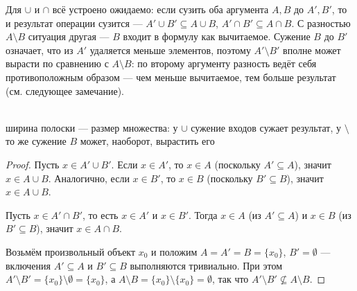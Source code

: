 \begin{intuition}
Для $\cup$ и $\cap$ всё устроено ожидаемо: если сузить оба аргумента $A,B$ до $A',B'$, то и
результат операции сузится — $A' \cup B' \subseteq A \cup B$, $A' \cap B' \subseteq A \cap B$.
С разностью $A \setminus B$ ситуация другая — $B$ входит в формулу как вычитаемое. Сужение
$B$ до $B'$ означает, что из $A'$ удаляется меньше элементов, поэтому $A' \setminus B'$
вполне может вырасти по сравнению с $A \setminus B$: по второму аргументу разность ведёт
себя противоположным образом — чем меньше вычитаемое, тем больше результат (см. следующее
замечание).

\begin{center}
\\
{\footnotesize\color{intuitiongray}ширина полоски — размер множества: у $\cup$ сужение
входов сужает результат, у $\setminus$ то же сужение $B$ может, наоборот, вырастить его}
\end{center}
\end{intuition}

\begin{proof}
 Пусть $x \in A' \cup B'$. Если $x \in A'$, то
$x \in A$ (поскольку $A' \subseteq A$), значит $x \in A \cup B$. Аналогично, если $x \in B'$,
то $x \in B$ (поскольку $B' \subseteq B$), значит $x \in A \cup B$.

 Пусть $x \in A' \cap B'$, то есть $x \in A'$ и
$x \in B'$. Тогда $x \in A$ (из $A' \subseteq A$) и $x \in B$ (из $B' \subseteq B$), значит
$x \in A \cap B$.

 Возьмём произвольный объект $x_0$ и положим
$A = A' = B = \{x_0\}$, $B' = \emptyset$ — включения $A' \subseteq A$ и $B' \subseteq B$
выполняются тривиально. При этом $A' \setminus B' = \{x_0\} \setminus \emptyset = \{x_0\}$, а
$A \setminus B = \{x_0\} \setminus \{x_0\} = \emptyset$, так что
$A' \setminus B' \not\subseteq A \setminus B$.
\end{proof}

